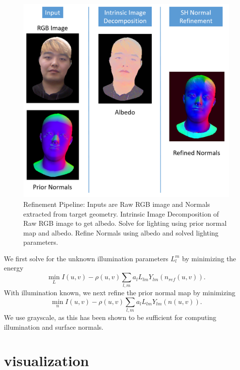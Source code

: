 \documentclass[10pt,twocolumn,letterpaper]{article}
\begin{document}
\begin{figure}[!h]
    \begin{center}
        \includegraphics [scale=0.25] {image/refine_pipeline.png}
    \end{center}
    \caption{Refinement Pipeline: Inputs are Raw RGB image and Normals extracted from target geometry. Intrinsic Image Decomposition of Raw RGB image to get albedo. Solve for lighting using prior normal map and albedo. Refine Normals using albedo and solved lighting parameters.}
    \label{fig:pipe2}
\end{figure} 
We first solve for the unknown illumination parameters $L_l^m$ by minimizing the energy
\begin{equation}
\min_{L} I(u,v) - \rho(u,v) \sum_{l,m} a_l L_{lm} Y_{lm}(n_{ref}(u,v)).
\end{equation}
With illumination known, we next refine the prior normal map by minimizing
\begin{equation}
\min_{n} I(u,v) - \rho(u,v) \sum_{l,m} a_l L_{lm} Y_{lm}(n(u,v)).
\end{equation}
We use grayscale, as this has been shown\cite{sfs} to be sufficient for computing illumination and surface normals. 

\section{visualization}
    
\end{document}
